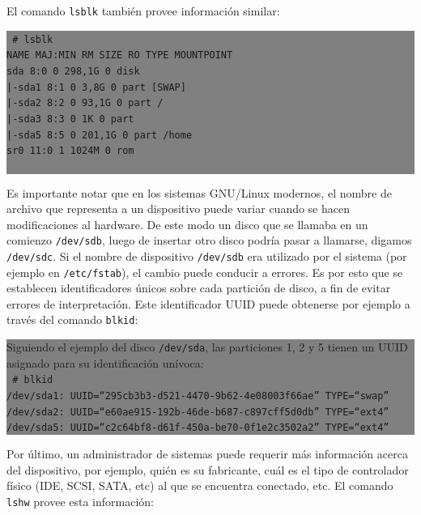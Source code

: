 \documentclass[12pt]{article}
\begin{document}
El comando \texttt{lsblk} también provee información similar: 

\colorbox{grey}{\parbox[t]{0.95\linewidth}{ \vspace*{0.5cm} { 
{\tt
\# lsblk \\
NAME   MAJ:MIN RM   SIZE RO TYPE MOUNTPOINT\\
sda      8:0    0 298,1G  0 disk \\
|-sda1   8:1    0   3,8G  0 part [SWAP]\\
|-sda2   8:2    0  93,1G  0 part /\\
|-sda3   8:3    0     1K  0 part \\
|-sda5   8:5    0 201,1G  0 part /home\\
sr0     11:0    1  1024M  0 rom  \\
\\
}
} \vspace*{0.5cm} } } 

Es importante notar que en los sistemas GNU/Linux modernos, el nombre de 
archivo que representa a un dispositivo puede variar cuando se hacen 
modificaciones al hardware. De este modo un disco que se llamaba en un 
comienzo \texttt{/dev/sdb}, luego de insertar otro disco podría pasar a llamarse,
digamos \texttt{/dev/sdc}. Si el nombre de dispositivo \texttt{/dev/sdb}
era utilizado por el sistema (por ejemplo en \texttt{/etc/fstab}), el cambio puede 
conducir a errores. Es por esto que se establecen identificadores
únicos sobre cada partición de disco, a fin de evitar errores de 
interpretación. Este identificador UUID puede obtenerse por ejemplo 
a través del comando \texttt{blkid}:  

\colorbox{grey}{\parbox[t]{0.95\linewidth}{ \vspace*{0.5cm} { 
Siguiendo el ejemplo del disco \texttt{/dev/sda}, las particiones 1, 2
y 5 tienen un UUID asignado para su identificación unívoca: \\ 
{\tt
\# blkid\\
/dev/sda1: UUID=``295cb3b3-d521-4470-9b62-4e08003f66ae'' TYPE=``swap''\\
/dev/sda2: UUID=``e60ae915-192b-46de-b687-c897cff5d0db'' TYPE=``ext4''\\
/dev/sda5: UUID=``c2c64bf8-d61f-450a-be70-0f1e2c3502a2'' TYPE=``ext4''\\ 
}
} \vspace*{0.5cm} } } 

Por último, un administrador de sistemas puede requerir más información acerca 
del dispositivo, por ejemplo, quién es su fabricante, cuál es el tipo de
controlador físico (IDE, SCSI, SATA, etc) al que se encuentra conectado, etc. 
El comando \texttt{lshw} provee esta información: 
\end{document}
